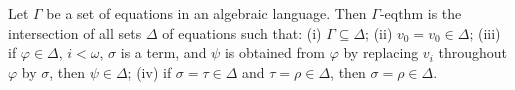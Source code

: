 Let $\Gamma$ be a set of equations in an algebraic language. Then $\Gamma\text{-eqthm}$ is the intersection of all sets $\Delta$ of equations such that:
(i) $\Gamma \subseteq \Delta$;
(ii) $v_0 = v_0 \in \Delta$;
(iii) if $\varphi \in \Delta$, $i < \omega$, $\sigma$ is a term, and $\psi$ is obtained from $\varphi$ by replacing $v_i$ throughout $\varphi$ by $\sigma$, then $\psi \in \Delta$;
(iv) if $\sigma = \tau \in \Delta$ and $\tau = \rho \in \Delta$, then $\sigma = \rho \in \Delta$.
